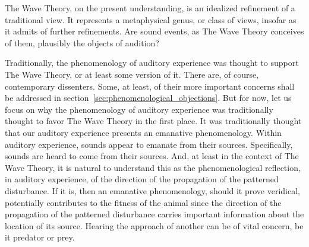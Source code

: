 The Wave Theory, on the present understanding, is an idealized refinement of a traditional view. It represents a metaphysical genus, or class of views, insofar as it admits of further refinements. Are sound events, as The Wave Theory conceives of them, plausibly the objects of audition?

Traditionally, the phenomenology of auditory experience was thought to support The Wave Theory, or at least some version of it. There are, of course, contemporary dissenters. Some, at least, of their more important concerns shall be addressed in section~\ref{sec:phenomenological_objections}. But for now, let us focus on why the phenomenology of auditory experience was traditionally thought to favor The Wave Theory in the first place. It was traditionally thought that our auditory experience presents an emanative phenomenology. Within auditory experience, sounds appear to emanate from their sources. Specifically, sounds are heard to come from their sources. And, at least in the context of The Wave Theory, it is natural to understand this as the phenomenological reflection, in auditory experience, of the direction of the propagation of the patterned disturbance. If it is, then an emanative phenomenology, should it prove veridical, potentially contributes to the fitness of the animal since the direction of the propagation of the patterned disturbance carries important information about the location of its source. Hearing the approach of another can be of vital concern, be it predator or prey.

